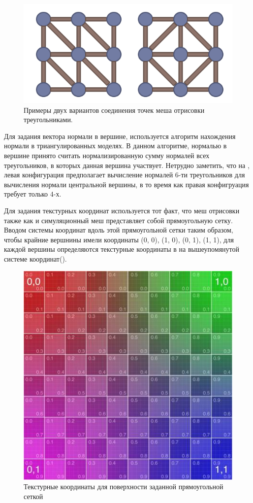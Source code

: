 	\begin{figure}[ht!] 
		\center
		\includegraphics [scale=1] {my_folder/images//meshConnect}
		\caption{Примеры двух вариантов соединения точек меша отрисовки треугольниками.}
		\label{fig:meshConnect}  
	\end{figure}
	
	Для задания вектора нормали в вершине, используется алгоритм нахождения нормали в триангулированных моделях. В данном алгоритме, нормалью в вершине принято считать нормализированную сумму нормалей всех треугольников, в которых данная вершина участвует. Нетрудно заметить, что на , левая конфигурация предполагает вычисление нормалей 6-ти треугольников для вычисления нормали центральной вершины, в то время как правая конфигруация требует только 4-х.
	
	Для задания текстурных координат используется тот факт, что меш отрисовки также как и симуляционный меш представляет собой прямоугольную сетку. Вводом системы координат вдоль этой прямоугольной сетки таким образом, чтобы крайние вершнины имели координаты (0, 0), (1, 0), (0, 1), (1, 1), для каждой вершины определяются текстурные координаты в на вышеупомянутой системе координат().
	
	\begin{figure}[ht!] 
		\center
		\includegraphics [scale=0.5] {my_folder/images//texCoord}
		\caption{Текстурные координаты для поверхности заданной прямоугольной сеткой}
		\label{fig:texCoord}  
	\end{figure}
	
